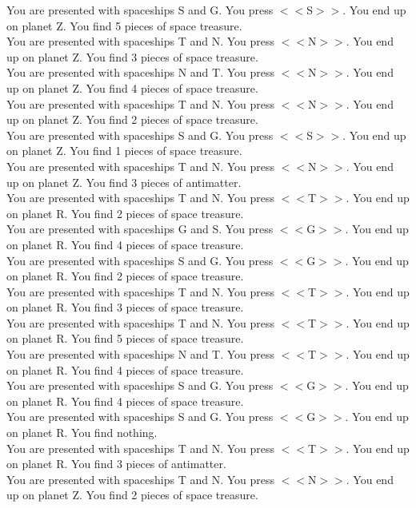 \documentclass[pdflatex,sn-nature]{sn-jnl}%
\theoremstyle{thmstyleone}%
\theoremstyle{thmstyletwo}%
\theoremstyle{thmstylethree}%
\begin{document}
You are presented with spaceships S and G. You press $<<$S$>>$. You end up on planet Z. You find 5 pieces of space treasure. $~$\\ 
You are presented with spaceships T and N. You press $<<$N$>>$. You end up on planet Z. You find 3 pieces of space treasure. $~$\\ 
You are presented with spaceships N and T. You press $<<$N$>>$. You end up on planet Z. You find 4 pieces of space treasure. $~$\\ 
You are presented with spaceships T and N. You press $<<$N$>>$. You end up on planet Z. You find 2 pieces of space treasure. $~$\\ 
You are presented with spaceships S and G. You press $<<$S$>>$. You end up on planet Z. You find 1 pieces of space treasure. $~$\\ 
You are presented with spaceships T and N. You press $<<$N$>>$. You end up on planet Z. You find 3 pieces of antimatter. $~$\\ 
You are presented with spaceships T and N. You press $<<$T$>>$. You end up on planet R. You find 2 pieces of space treasure. $~$\\ 
You are presented with spaceships G and S. You press $<<$G$>>$. You end up on planet R. You find 4 pieces of space treasure. $~$\\ 
You are presented with spaceships S and G. You press $<<$G$>>$. You end up on planet R. You find 2 pieces of space treasure. $~$\\ 
You are presented with spaceships T and N. You press $<<$T$>>$. You end up on planet R. You find 3 pieces of space treasure. $~$\\ 
You are presented with spaceships T and N. You press $<<$T$>>$. You end up on planet R. You find 5 pieces of space treasure. $~$\\ 
You are presented with spaceships N and T. You press $<<$T$>>$. You end up on planet R. You find 4 pieces of space treasure. $~$\\ 
You are presented with spaceships S and G. You press $<<$G$>>$. You end up on planet R. You find 4 pieces of space treasure. $~$\\ 
You are presented with spaceships S and G. You press $<<$G$>>$. You end up on planet R. You find nothing. $~$\\ 
You are presented with spaceships T and N. You press $<<$T$>>$. You end up on planet R. You find 3 pieces of antimatter. $~$\\ 
You are presented with spaceships T and N. You press $<<$N$>>$. You end up on planet Z. You find 2 pieces of space treasure. $~$\\ 
\end{document}
